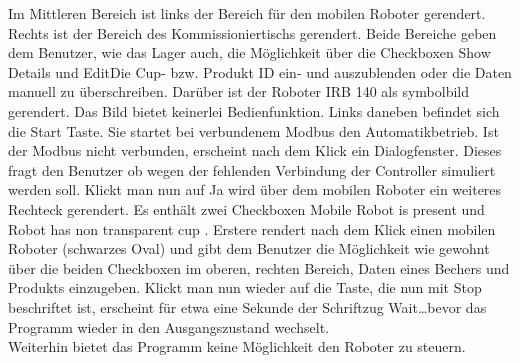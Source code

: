 Im Mittleren Bereich ist links der Bereich für den mobilen Roboter gerendert.
Rechts ist der Bereich des Kommissioniertischs gerendert.
Beide Bereiche geben dem Benutzer, wie das Lager auch, die Möglichkeit über die Checkboxen \glqq Show Details \grqq
und \glqq Edit\grqq Die Cup- bzw. Produkt ID ein- und auszublenden oder die Daten manuell zu überschreiben.
Darüber ist der Roboter IRB 140 als symbolbild gerendert.
Das Bild bietet keinerlei Bedienfunktion. Links daneben befindet sich die \glqq Start \grqq Taste.
Sie startet bei verbundenem Modbus den Automatikbetrieb.
Ist der Modbus nicht verbunden, erscheint nach dem Klick ein Dialogfenster.
Dieses fragt den Benutzer ob wegen der fehlenden Verbindung der Controller simuliert werden soll.
Klickt man nun auf \glqq Ja \grqq wird über dem mobilen Roboter ein weiteres Rechteck gerendert.
Es enthält zwei Checkboxen \glqq Mobile Robot is present \grqq und \glqq Robot has non transparent cup \grqq.
Erstere rendert nach dem Klick einen mobilen Roboter (schwarzes Oval) und gibt dem Benutzer die Möglichkeit
wie gewohnt über die beiden Checkboxen im oberen, rechten Bereich, Daten eines Bechers und Produkts einzugeben.
Klickt man nun wieder auf die Taste, die nun mit \glqq Stop \grqq beschriftet ist, erscheint für etwa eine Sekunde
der Schriftzug \glqq Wait\ldots \grqq bevor das Programm wieder in den Ausgangszustand wechselt.\\

Weiterhin bietet das Programm keine Möglichkeit den Roboter zu steuern.




\newpage
